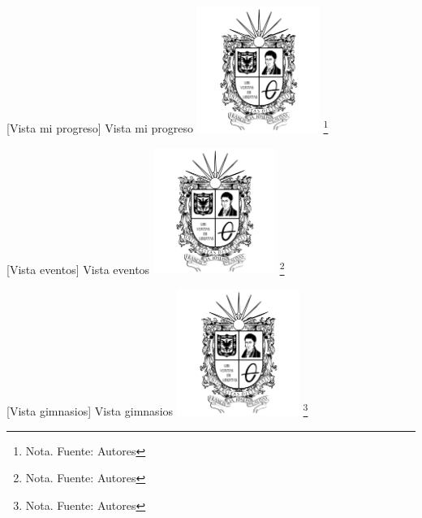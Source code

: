 {    \vspace{2mm}
    \begin{minipage}{0.9\textwidth}
    \centering
    [{Vista mi progreso}]{ Vista mi progreso }
    \label{prot5}
    \includegraphics[width=0.3\textwidth]{Content/Images/Escudo_UD.png}
    \footnote{Nota. \textup{Fuente: Autores}}
    \end{minipage}
    
        \vspace{2mm}
    \begin{minipage}{0.9\textwidth}
    \centering
    [{Vista eventos}]{ Vista eventos }
    \label{prot6}
    \includegraphics[width=0.3\textwidth]{Content/Images/Escudo_UD.png}
    \footnote{Nota. \textup{Fuente: Autores}}
    \end{minipage}

        \vspace{2mm}
    \begin{minipage}{0.9\textwidth}
    \centering
    [{Vista gimnasios}]{ Vista gimnasios }
    \label{prot7}
    \includegraphics[width=0.3\textwidth]{Content/Images/Escudo_UD.png}
    \footnote{Nota. \textup{Fuente: Autores}}
    \end{minipage}

}
